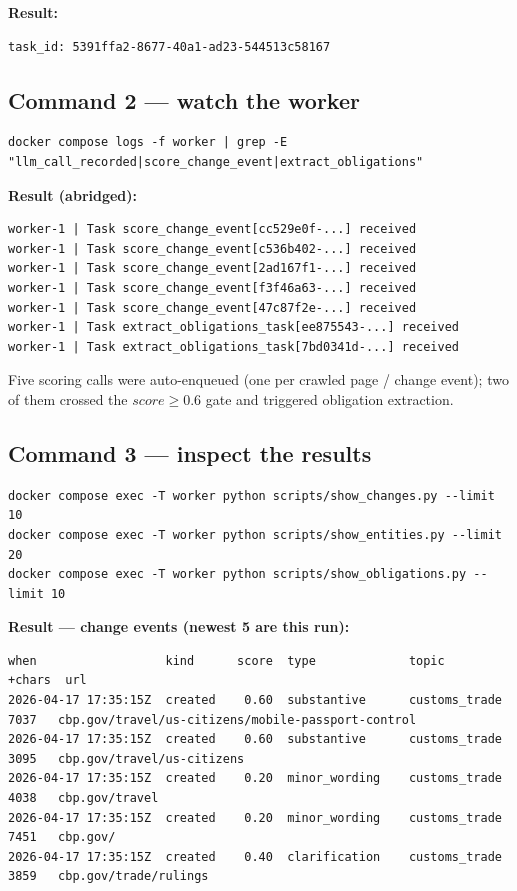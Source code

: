 \documentclass[11pt,a4paper]{article}
\begin{document}
\textbf{Result:}
\begin{lstlisting}[style=output]
task_id: 5391ffa2-8677-40a1-ad23-544513c58167
\end{lstlisting}

\subsection{Command 2 --- watch the worker}

\begin{lstlisting}[style=shell]
docker compose logs -f worker | grep -E "llm_call_recorded|score_change_event|extract_obligations"
\end{lstlisting}

\textbf{Result (abridged):}
\begin{lstlisting}[style=output]
worker-1 | Task score_change_event[cc529e0f-...] received
worker-1 | Task score_change_event[c536b402-...] received
worker-1 | Task score_change_event[2ad167f1-...] received
worker-1 | Task score_change_event[f3f46a63-...] received
worker-1 | Task score_change_event[47c87f2e-...] received
worker-1 | Task extract_obligations_task[ee875543-...] received
worker-1 | Task extract_obligations_task[7bd0341d-...] received
\end{lstlisting}

Five scoring calls were auto-enqueued (one per crawled page / change
event); two of them crossed the $score \geq 0.6$ gate and triggered
obligation extraction.

\subsection{Command 3 --- inspect the results}

\begin{lstlisting}[style=shell]
docker compose exec -T worker python scripts/show_changes.py --limit 10
docker compose exec -T worker python scripts/show_entities.py --limit 20
docker compose exec -T worker python scripts/show_obligations.py --limit 10
\end{lstlisting}

\textbf{Result --- change events (newest 5 are this run):}
\begin{lstlisting}[style=output]
when                  kind      score  type             topic            +chars  url
2026-04-17 17:35:15Z  created    0.60  substantive      customs_trade     7037   cbp.gov/travel/us-citizens/mobile-passport-control
2026-04-17 17:35:15Z  created    0.60  substantive      customs_trade     3095   cbp.gov/travel/us-citizens
2026-04-17 17:35:15Z  created    0.20  minor_wording    customs_trade     4038   cbp.gov/travel
2026-04-17 17:35:15Z  created    0.20  minor_wording    customs_trade     7451   cbp.gov/
2026-04-17 17:35:15Z  created    0.40  clarification    customs_trade     3859   cbp.gov/trade/rulings
\end{lstlisting}
\end{document}
